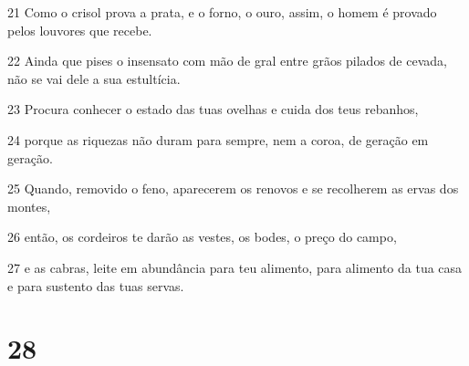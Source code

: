 \par 21 Como o crisol prova a prata, e o forno, o ouro, assim, o homem é provado pelos louvores que recebe.
\par 22 Ainda que pises o insensato com mão de gral entre grãos pilados de cevada, não se vai dele a sua estultícia.
\par 23 Procura conhecer o estado das tuas ovelhas e cuida dos teus rebanhos,
\par 24 porque as riquezas não duram para sempre, nem a coroa, de geração em geração.
\par 25 Quando, removido o feno, aparecerem os renovos e se recolherem as ervas dos montes,
\par 26 então, os cordeiros te darão as vestes, os bodes, o preço do campo,
\par 27 e as cabras, leite em abundância para teu alimento, para alimento da tua casa e para sustento das tuas servas.

\chapter{28}

